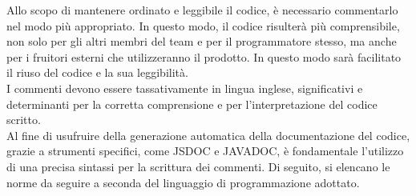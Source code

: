 			 \label{sec:NormeCommenti}
			Allo scopo di mantenere ordinato e leggibile il codice, è necessario commentarlo nel modo più appropriato. In questo modo, il codice risulterà più comprensibile, non solo per gli altri membri del team e per il programmatore stesso, ma anche per i fruitori esterni che utilizzeranno il prodotto. In questo modo sarà facilitato il riuso del codice e la sua leggibilità. \\
			I commenti devono essere tassativamente in lingua inglese, significativi e determinanti per la corretta comprensione e per l'interpretazione del codice scritto.\\
			Al fine di usufruire della generazione automatica della documentazione del codice, grazie a strumenti specifici, come JSDOC e JAVADOC, è fondamentale l'utilizzo di una precisa sintassi per la scrittura dei commenti.
			Di seguito, si elencano le norme da seguire a seconda del linguaggio di programmazione adottato.

